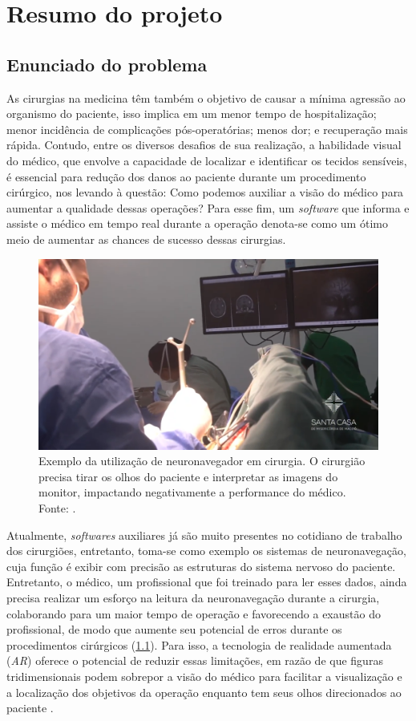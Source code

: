 \chapter{Resumo do projeto}\label{chp:resultadosEsparados}

\section{Enunciado do problema}

As cirurgias na medicina têm também o objetivo de causar a mínima agressão ao organismo do paciente, isso implica em um menor tempo de hospitalização; menor incidência de complicações pós-operatórias; menos dor; e recuperação mais rápida. Contudo, entre os diversos desafios de sua realização, a habilidade visual do médico, que envolve a capacidade de localizar e identificar os tecidos sensíveis, é essencial para redução dos danos ao paciente durante um procedimento cirúrgico, nos levando à questão: Como podemos auxiliar a visão do médico para aumentar a qualidade dessas operações? Para esse fim, um \textit{software} que informa e assiste o médico em tempo real durante a operação denota-se como um ótimo meio de aumentar as chances de sucesso dessas cirurgias.

\begin{figure}
    \centering
    \includegraphics[width=.55\linewidth]{figuras/enunciado.png}
    \caption{Exemplo da utilização de neuronavegador em cirurgia. O cirurgião precisa tirar os olhos do paciente e interpretar as imagens do monitor, impactando negativamente a performance do médico. Fonte: \cite{santacasa}.}
    \label{fig:enunciado}
\end{figure}

Atualmente, \textit{softwares} auxiliares já são muito presentes no cotidiano de trabalho dos cirurgiões, entretanto, toma-se como exemplo os sistemas de neuronavegação, cuja função é exibir com precisão as estruturas do sistema nervoso do paciente. Entretanto, o médico, um profissional que foi treinado para ler esses dados, ainda precisa realizar um esforço na leitura da neuronavegação durante a cirurgia, colaborando para um maior tempo de operação e favorecendo a exaustão do profissional, de modo que aumente seu potencial de erros durante os procedimentos cirúrgicos (\ref{fig:enunciado}). Para isso, a tecnologia de realidade aumentada (\textit{AR}) oferece o potencial de reduzir essas limitações, em razão de que figuras tridimensionais podem sobrepor a visão do médico para facilitar a visualização e a localização dos objetivos da operação enquanto tem seus olhos direcionados ao paciente \cite{enhancedvision}.

